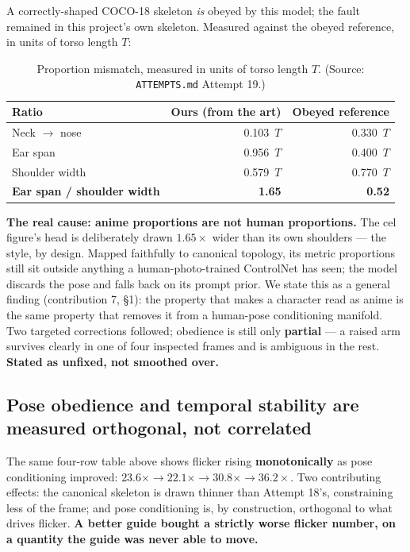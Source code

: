 \documentclass[11pt]{article}
\newcommand{\secsym}{\S}
\begin{document}
A correctly-shaped COCO-18 skeleton \emph{is} obeyed by this model; the
fault remained in this project's own skeleton. Measured against the
obeyed reference, in units of torso length $T$:

\begin{table}[h]
\centering
\caption{Proportion mismatch, measured in units of torso length $T$.
(Source: \texttt{ATTEMPTS.md} Attempt 19.)}
\label{tab:proportions}
\begin{tabular}{@{}lrr@{}}
\toprule
Ratio & Ours (from the art) & Obeyed reference \\
\midrule
Neck $\rightarrow$ nose & 0.103~$T$ & 0.330~$T$ \\
Ear span & 0.956~$T$ & 0.400~$T$ \\
Shoulder width & 0.579~$T$ & 0.770~$T$ \\
\textbf{Ear span / shoulder width} & \textbf{1.65} & \textbf{0.52} \\
\bottomrule
\end{tabular}
\end{table}

\textbf{The real cause: anime proportions are not human proportions.} The
cel figure's head is deliberately drawn $1.65\times$ wider than its own
shoulders --- the style, by design. Mapped faithfully to canonical
topology, its metric proportions still sit outside anything a
human-photo-trained ControlNet has seen; the model discards the pose and
falls back on its prompt prior. We state this as a general finding
(contribution 7, \secsym1): the property that makes a character read as
anime is the same property that removes it from a human-pose conditioning
manifold. Two targeted corrections followed; obedience is still only
\textbf{partial} --- a raised arm survives clearly in one of four
inspected frames and is ambiguous in the rest. \textbf{Stated as unfixed,
not smoothed over.}

\subsection{Pose obedience and temporal stability are measured orthogonal, not correlated}
\label{sec:orthogonal}

The same four-row table above shows flicker rising \textbf{monotonically}
as pose conditioning improved: $23.6\times \rightarrow 22.1\times
\rightarrow 30.8\times \rightarrow 36.2\times$. Two contributing effects:
the canonical skeleton is drawn thinner than Attempt 18's, constraining
less of the frame; and pose conditioning is, by construction, orthogonal
to what drives flicker. \textbf{A better guide bought a strictly worse
flicker number, on a quantity the guide was never able to move.}
\end{document}
